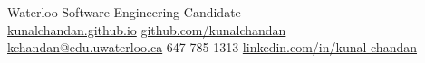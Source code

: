 \documentclass[]{chandan-cv}
\begin{document}
%
%

%
%
{
	Waterloo Software Engineering Candidate \\
	\href{http://kunalchandan.github.io}{kunalchandan.github.io}
	\hfill
	\href{http://github.com/kunalchandan}{github.com/kunalchandan}\\
	\href{mailto:kchandan@edu.uwaterloo.ca}{kchandan@edu.uwaterloo.ca}
	\hfill
	647-785-1313
	\hfill
	\href{https://www.linkedin.com/in/kunal-chandan/}{linkedin.com/in/kunal-chandan}
}

%
%
\end{document}
